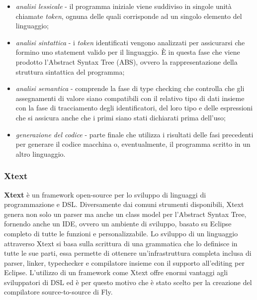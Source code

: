 \begin{itemize}
    \item \textit{analisi lessicale} - il programma iniziale viene suddiviso in singole unità chiamate \textit{token}, ognuna delle quali corrisponde ad un singolo elemento del linguaggio;
    
    \item \textit{analisi sintattica} - i \textit{token} identificati vengono analizzati per assicurarsi che formino uno statement valido per il linguaggio. È in questa fase che viene prodotto l’Abstract Syntax Tree (ABS), ovvero la rappresentazione della struttura sintattica del programma;
    
    \item \textit{analisi semantica} - comprende la fase di type checking che controlla che gli assegnamenti di valore siano compatibili con il relativo tipo di dati insieme con la fase di tracciamento degli identificatori, del loro tipo e delle espressioni che si assicura anche che i primi siano stati dichiarati prima dell’uso;
    
    \item \textit{generazione del codice} - parte finale che utilizza i risultati delle fasi precedenti per generare il codice macchina o, eventualmente, il programma scritto in un altro linguaggio.
\end{itemize}

\subsubsection{Xtext}
\textbf{Xtext} \cite{Xtext} è un framework open-source per lo sviluppo di linguaggi di programmazione e DSL. Diversamente dai comuni strumenti disponibili, Xtext genera non solo un parser ma anche un class model per l’Abstract Syntax Tree, fornendo anche un IDE, ovvero un ambiente di sviluppo, basato su Eclipse completo di tutte le funzioni e personalizzabile. Lo sviluppo di un linguaggio attraverso Xtext si basa sulla scrittura di una grammatica che lo definisce in tutte le sue parti, essa permette di ottenere un’infrastruttura completa inclusa di parser, linker, typechecker e compilatore insieme con il supporto all’editing per Eclipse. L’utilizzo di un framework come Xtext offre enormi vantaggi agli sviluppatori di DSL ed è per questo motivo che è stato scelto per la creazione del compilatore source-to-source di Fly.

